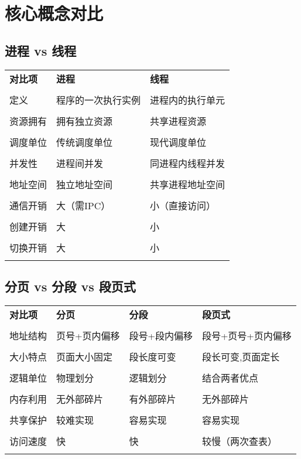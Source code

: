 \documentclass[lang=cn,newtx,10pt,scheme=chinese]{../../elegantbook}
\begin{document}
\chapter{核心概念对比}

\section{进程 vs 线程}

\begin{longtable}{@{}p{3cm}p{5cm}p{5cm}@{}}
\toprule
\textbf{对比项} & \textbf{进程} & \textbf{线程} \\\\ \midrule
\endhead

定义 & 程序的一次执行实例 & 进程内的执行单元 \\\\
资源拥有 & 拥有独立资源 & 共享进程资源 \\\\
调度单位 & 传统调度单位 & 现代调度单位 \\\\
并发性 & 进程间并发 & 同进程内线程并发 \\\\
地址空间 & 独立地址空间 & 共享进程地址空间 \\\\
通信开销 & 大（需IPC） & 小（直接访问） \\\\
创建开销 & 大 & 小 \\\\
切换开销 & 大 & 小 \\\\

\bottomrule
\end{longtable}

\section{分页 vs 分段 vs 段页式}

\begin{longtable}{@{}p{2.5cm}p{4cm}p{4cm}p{3cm}@{}}
\toprule
\textbf{对比项} & \textbf{分页} & \textbf{分段} & \textbf{段页式} \\\\ \midrule
\endhead

地址结构 & 页号+页内偏移 & 段号+段内偏移 & 段号+页号+页内偏移 \\\\
大小特点 & 页面大小固定 & 段长度可变 & 段长可变,页面定长 \\\\
逻辑单位 & 物理划分 & 逻辑划分 & 结合两者优点 \\\\
内存利用 & 无外部碎片 & 有外部碎片 & 无外部碎片 \\\\
共享保护 & 较难实现 & 容易实现 & 容易实现 \\\\
访问速度 & 快 & 快 & 较慢（两次查表） \\\\

\bottomrule
\end{longtable}
\end{document}
